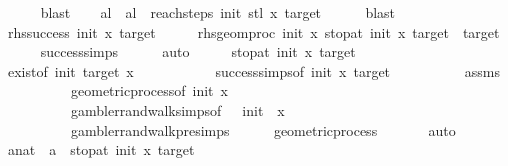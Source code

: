 \begin{isabellebody}
\ \ \ \ \isamarkupfalse%
\ blast\isanewline
\ \ \isamarkupfalse%
\ al\ \ {\isachardoublequoteopen}al\ {\isacharequal}{\kern0pt}\ reach{\isacharunderscore}{\kern0pt}steps\ init{\isacharprime}{\kern0pt}\ {\isacharparenleft}{\kern0pt}stl\ x{\isacharparenright}{\kern0pt}\ target{\isachardoublequoteclose}\isanewline
\ \ \ \ \isamarkupfalse%
\ blast\isanewline
\ \ \isamarkupfalse%
\ rhs{\isacharcolon}{\kern0pt}{\isachardoublequoteopen}success\ init\ x\ target{\isachardoublequoteclose}\isanewline
\ \ \isamarkupfalse%
\ \isamarkupfalse%
\ rhs{}{\isacharcolon}{\kern0pt}{\isachardoublequoteopen}geom{\isacharunderscore}{\kern0pt}proc\ init\ x\ {\isacharparenleft}{\kern0pt}stop{\isacharunderscore}{\kern0pt}at\ init\ x\ target{\isacharparenright}{\kern0pt}\ {\isacharequal}{\kern0pt}\ target{\isachardoublequoteclose}\isanewline
\ \ \ \ \isamarkupfalse%
\ success{\isachardot}{\kern0pt}simps\isanewline
\ \ \ \ \isamarkupfalse%
\ auto\isanewline
\ \ \isamarkupfalse%
\ \isamarkupfalse%
\ {\isachardoublequoteopen}stop{\isacharunderscore}{\kern0pt}at\ init\ x\ target\ {\isasymnoteq}\ {\isasyminfinity}{\isachardoublequoteclose}\isanewline
\ \ \ \ \isamarkupfalse%
\ exist{\isacharbrackleft}{\kern0pt}of\ init\ target\ x{\isacharbrackright}{\kern0pt}\ \isanewline
\ \ \ \ \ \ \ \ \ \ success{\isachardot}{\kern0pt}simps{\isacharbrackleft}{\kern0pt}of\ init\ x\ target{\isacharbrackright}{\kern0pt}\isanewline
\ \ \ \ \ \ \ \ \ \ assms\isanewline
\ \ \ \ \ \ \ \ \ \ geometric{\isacharunderscore}{\kern0pt}process{\isacharbrackleft}{\kern0pt}of\ init\ x\ {}{\isacharbrackright}{\kern0pt}\isanewline
\ \ \ \ \ \ \ \ \ \ gambler{\isacharunderscore}{\kern0pt}rand{\isacharunderscore}{\kern0pt}walk{\isachardot}{\kern0pt}simps{\isacharbrackleft}{\kern0pt}of\ {}\ {\isachardoublequoteopen}{\isacharminus}{\kern0pt}{}{\isachardoublequoteclose}\ init\ {}\ x{\isacharbrackright}{\kern0pt}\isanewline
\ \ \ \ \ \ \ \ \ \ gambler{\isacharunderscore}{\kern0pt}rand{\isacharunderscore}{\kern0pt}walk{\isacharunderscore}{\kern0pt}pre{\isachardot}{\kern0pt}simps\isanewline
\ \ \ \ \isamarkupfalse%
\ geometric{\isacharunderscore}{\kern0pt}process\ \isanewline
\ \ \ \ \isamarkupfalse%
\ auto\isanewline
\ \ \isamarkupfalse%
\ \isamarkupfalse%
\ a{\isacharprime}{\kern0pt}{\isacharcolon}{\kern0pt}{\isacharcolon}{\kern0pt}nat\ \ {\isachardoublequoteopen}a{\isacharprime}{\kern0pt}\ {\isacharequal}{\kern0pt}\ stop{\isacharunderscore}{\kern0pt}at\ init\ x\ target{\isachardoublequoteclose}\isanewline

\end{isabellebody}
